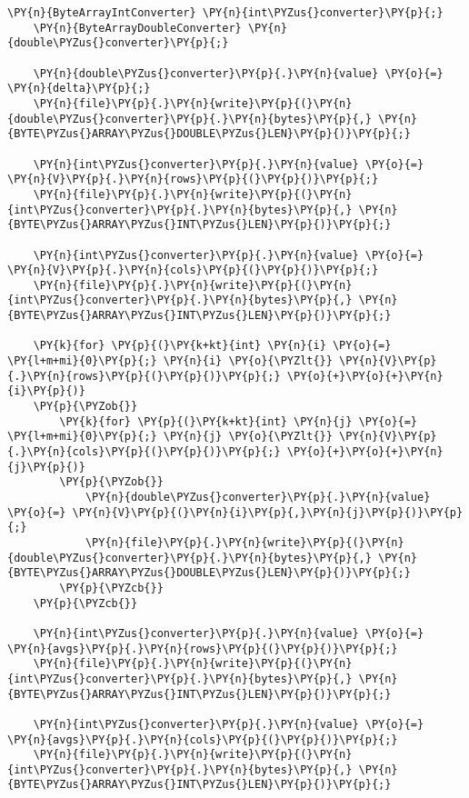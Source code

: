 \begin{Verbatim}[commandchars=\\\{\}]
	\PY{n}{ByteArrayIntConverter} \PY{n}{int\PYZus{}converter}\PY{p}{;}
	\PY{n}{ByteArrayDoubleConverter} \PY{n}{double\PYZus{}converter}\PY{p}{;}

    \PY{n}{double\PYZus{}converter}\PY{p}{.}\PY{n}{value} \PY{o}{=} \PY{n}{delta}\PY{p}{;}
    \PY{n}{file}\PY{p}{.}\PY{n}{write}\PY{p}{(}\PY{n}{double\PYZus{}converter}\PY{p}{.}\PY{n}{bytes}\PY{p}{,} \PY{n}{BYTE\PYZus{}ARRAY\PYZus{}DOUBLE\PYZus{}LEN}\PY{p}{)}\PY{p}{;}

    \PY{n}{int\PYZus{}converter}\PY{p}{.}\PY{n}{value} \PY{o}{=} \PY{n}{V}\PY{p}{.}\PY{n}{rows}\PY{p}{(}\PY{p}{)}\PY{p}{;}
    \PY{n}{file}\PY{p}{.}\PY{n}{write}\PY{p}{(}\PY{n}{int\PYZus{}converter}\PY{p}{.}\PY{n}{bytes}\PY{p}{,} \PY{n}{BYTE\PYZus{}ARRAY\PYZus{}INT\PYZus{}LEN}\PY{p}{)}\PY{p}{;}

    \PY{n}{int\PYZus{}converter}\PY{p}{.}\PY{n}{value} \PY{o}{=} \PY{n}{V}\PY{p}{.}\PY{n}{cols}\PY{p}{(}\PY{p}{)}\PY{p}{;}
    \PY{n}{file}\PY{p}{.}\PY{n}{write}\PY{p}{(}\PY{n}{int\PYZus{}converter}\PY{p}{.}\PY{n}{bytes}\PY{p}{,} \PY{n}{BYTE\PYZus{}ARRAY\PYZus{}INT\PYZus{}LEN}\PY{p}{)}\PY{p}{;}

    \PY{k}{for} \PY{p}{(}\PY{k+kt}{int} \PY{n}{i} \PY{o}{=} \PY{l+m+mi}{0}\PY{p}{;} \PY{n}{i} \PY{o}{\PYZlt{}} \PY{n}{V}\PY{p}{.}\PY{n}{rows}\PY{p}{(}\PY{p}{)}\PY{p}{;} \PY{o}{+}\PY{o}{+}\PY{n}{i}\PY{p}{)}
    \PY{p}{\PYZob{}}
    	\PY{k}{for} \PY{p}{(}\PY{k+kt}{int} \PY{n}{j} \PY{o}{=} \PY{l+m+mi}{0}\PY{p}{;} \PY{n}{j} \PY{o}{\PYZlt{}} \PY{n}{V}\PY{p}{.}\PY{n}{cols}\PY{p}{(}\PY{p}{)}\PY{p}{;} \PY{o}{+}\PY{o}{+}\PY{n}{j}\PY{p}{)}
    	\PY{p}{\PYZob{}}
    		\PY{n}{double\PYZus{}converter}\PY{p}{.}\PY{n}{value} \PY{o}{=} \PY{n}{V}\PY{p}{(}\PY{n}{i}\PY{p}{,}\PY{n}{j}\PY{p}{)}\PY{p}{;}
    		\PY{n}{file}\PY{p}{.}\PY{n}{write}\PY{p}{(}\PY{n}{double\PYZus{}converter}\PY{p}{.}\PY{n}{bytes}\PY{p}{,} \PY{n}{BYTE\PYZus{}ARRAY\PYZus{}DOUBLE\PYZus{}LEN}\PY{p}{)}\PY{p}{;}
    	\PY{p}{\PYZcb{}}
    \PY{p}{\PYZcb{}}

    \PY{n}{int\PYZus{}converter}\PY{p}{.}\PY{n}{value} \PY{o}{=} \PY{n}{avgs}\PY{p}{.}\PY{n}{rows}\PY{p}{(}\PY{p}{)}\PY{p}{;}
    \PY{n}{file}\PY{p}{.}\PY{n}{write}\PY{p}{(}\PY{n}{int\PYZus{}converter}\PY{p}{.}\PY{n}{bytes}\PY{p}{,} \PY{n}{BYTE\PYZus{}ARRAY\PYZus{}INT\PYZus{}LEN}\PY{p}{)}\PY{p}{;}

    \PY{n}{int\PYZus{}converter}\PY{p}{.}\PY{n}{value} \PY{o}{=} \PY{n}{avgs}\PY{p}{.}\PY{n}{cols}\PY{p}{(}\PY{p}{)}\PY{p}{;}
    \PY{n}{file}\PY{p}{.}\PY{n}{write}\PY{p}{(}\PY{n}{int\PYZus{}converter}\PY{p}{.}\PY{n}{bytes}\PY{p}{,} \PY{n}{BYTE\PYZus{}ARRAY\PYZus{}INT\PYZus{}LEN}\PY{p}{)}\PY{p}{;}


\end{Verbatim}
